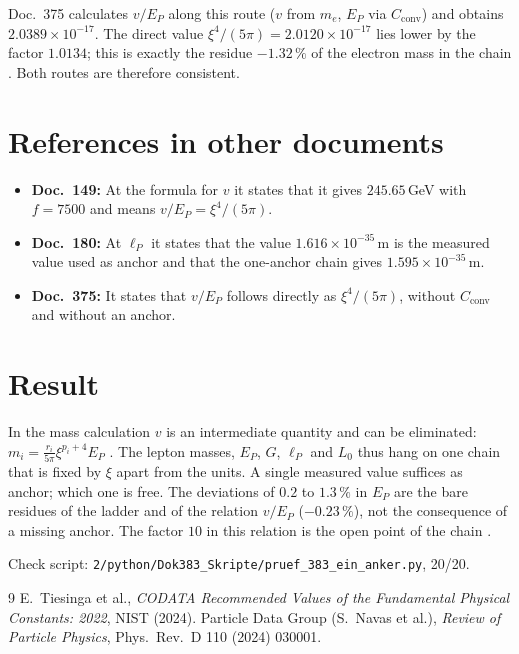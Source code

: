 Doc.~375 calculates $v/E_P$ along this route ($v$ from $m_e$, $E_P$ via
$C_{\text{conv}}$) and obtains $2.0389\times10^{-17}$. The direct value
$\xi^4/(5\pi)=2.0120\times10^{-17}$ lies lower by the factor $1.0134$; this is exactly
the residue $-1.32\,\%$ of the electron mass in the chain \KM. Both routes are therefore
consistent.

\section{References in other documents}
\begin{itemize}
\item \textbf{Doc.~149:} At the formula for $v$ it states that it gives $245.65$\,GeV
  with $f=7500$ and means $v/E_P=\xi^4/(5\pi)$.
\item \textbf{Doc.~180:} At $\ell_P$ it states that the value $1.616\times10^{-35}$\,m
  is the measured value used as anchor and that the one-anchor chain gives
  $1.595\times10^{-35}$\,m.
\item \textbf{Doc.~375:} It states that $v/E_P$ follows directly as $\xi^4/(5\pi)$,
  without $C_{\text{conv}}$ and without an anchor.
\end{itemize}

\section{Result}
In the mass calculation $v$ is an intermediate quantity and can be eliminated:
$m_i=\frac{r_i}{5\pi}\xi^{p_i+4}E_P$ \BM. The lepton masses, $E_P$, $G$, $\ell_P$ and
$L_0$ thus hang on one chain that is fixed by $\xi$ apart from the units. A single
measured value suffices as anchor; which one is free. The deviations of $0.2$ to
$1.3\,\%$ in $E_P$ are the bare residues of the ladder and of the relation $v/E_P$
($-0.23\,\%$), not the consequence of a missing anchor. The factor $10$ in this
relation is the open point of the chain \SM.

\medskip\noindent Check script: \texttt{2/python/Dok383\_Skripte/pruef\_383\_ein\_anker.py}, 20/20.

\begin{thebibliography}{9}
 E.~Tiesinga et al., \emph{CODATA Recommended Values of the
  Fundamental Physical Constants: 2022}, NIST (2024).
 Particle Data Group (S.~Navas et al.), \emph{Review of Particle
  Physics}, Phys.\ Rev.\ D 110 (2024) 030001.
\end{thebibliography}
